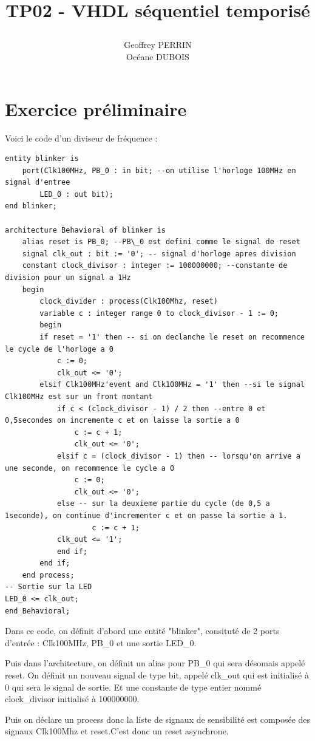 \documentclass[11pt]{report}
\title{\textbf{TP02 - VHDL séquentiel temporisé}
\author{Geoffrey PERRIN \\ Océane DUBOIS\\}
\date{}}
\begin{document}
\maketitle

\newpage

\section{Exercice préliminaire}

Voici le code d'un diviseur de fréquence  :
\begin{lstlisting}
entity blinker is
	port(Clk100MHz, PB_0 : in bit; --on utilise l'horloge 100MHz en signal d'entree
		LED_0 : out bit);
end blinker;

architecture Behavioral of blinker is
	alias reset is PB_0; --PB\_0 est defini comme le signal de reset
	signal clk_out : bit := '0'; -- signal d'horloge apres division
	constant clock_divisor : integer := 100000000; --constante de division pour un signal a 1Hz
	begin
		clock_divider : process(Clk100Mhz, reset)
		variable c : integer range 0 to clock_divisor - 1 := 0;
		begin
		if reset = '1' then -- si on declanche le reset on recommence le cycle de l'horloge a 0
			c := 0;
			clk_out <= '0';
		elsif Clk100MHz'event and Clk100MHz = '1' then --si le signal Clk100MHz est sur un front montant
			if c < (clock_divisor - 1) / 2 then --entre 0 et 0,5secondes on incremente c et on laisse la sortie a 0
				c := c + 1;
				clk_out <= '0';
			elsif c = (clock_divisor - 1) then -- lorsqu'on arrive a une seconde, on recommence le cycle a 0
				c := 0;
				clk_out <= '0';
			else -- sur la deuxieme partie du cycle (de 0,5 a 1seconde), on continue d'incrementer c et on passe la sortie a 1.
					c := c + 1;
			clk_out <= '1';
			end if;
		end if;
	end process;
-- Sortie sur la LED
LED_0 <= clk_out;
end Behavioral;
\end{lstlisting}

Dans ce code, on définit d'abord une entité "blinker", consituté de 2 ports d'entrée : Clk100MHz, PB\_0 et une sortie LED\_0.

Puis dans l'architecture, on définit un alias pour PB\_0 qui sera désomais appelé reset. On définit un nouveau signal de type bit, appelé clk\_out qui est initialisé à 0 qui sera le signal de sortie.  Et une constante de type entier nommé clock\_divisor initialisé à 100000000.

Puis on déclare un process donc la liste de signaux de sensibilité est composée des signaux Clk100Mhz et reset.C'est donc un reset asynchrone.
\end{document}
